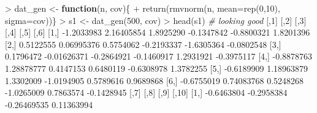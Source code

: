 \documentclass[
]{article}
\newenvironment{Shaded}{\begin{snugshade}}{\end{snugshade}}
\newcommand{\AttributeTok}[1]{\textcolor[rgb]{0.77,0.63,0.00}{#1}}
\newcommand{\CommentTok}[1]{\textcolor[rgb]{0.56,0.35,0.01}{\textit{#1}}}
\newcommand{\ControlFlowTok}[1]{\textcolor[rgb]{0.13,0.29,0.53}{\textbf{#1}}}
\newcommand{\DecValTok}[1]{\textcolor[rgb]{0.00,0.00,0.81}{#1}}
\newcommand{\FloatTok}[1]{\textcolor[rgb]{0.00,0.00,0.81}{#1}}
\newcommand{\FunctionTok}[1]{\textcolor[rgb]{0.00,0.00,0.00}{#1}}
\newcommand{\NormalTok}[1]{#1}
\newcommand{\OtherTok}[1]{\textcolor[rgb]{0.56,0.35,0.01}{#1}}
\newcommand{\SpecialCharTok}[1]{\textcolor[rgb]{0.00,0.00,0.00}{#1}}
\begin{document}
\begin{Shaded}
\begin{Highlighting}[]
\SpecialCharTok{\textgreater{}}\NormalTok{ dat\_gen }\OtherTok{\textless{}{-}} \ControlFlowTok{function}\NormalTok{(n, cov)\{}
\SpecialCharTok{+}   \FunctionTok{return}\NormalTok{(}\FunctionTok{rmvnorm}\NormalTok{(n, }\AttributeTok{mean=}\FunctionTok{rep}\NormalTok{(}\DecValTok{0}\NormalTok{,}\DecValTok{10}\NormalTok{), }\AttributeTok{sigma=}\NormalTok{cov))\}}
\SpecialCharTok{\textgreater{}}\NormalTok{ s1 }\OtherTok{\textless{}{-}} \FunctionTok{dat\_gen}\NormalTok{(}\DecValTok{500}\NormalTok{, cov)}
\SpecialCharTok{\textgreater{}} \FunctionTok{head}\NormalTok{(s1) }\CommentTok{\# looking good}
\NormalTok{           [,}\DecValTok{1}\NormalTok{]        [,}\DecValTok{2}\NormalTok{]       [,}\DecValTok{3}\NormalTok{]       [,}\DecValTok{4}\NormalTok{]       [,}\DecValTok{5}\NormalTok{]       [,}\DecValTok{6}\NormalTok{]}
\NormalTok{[}\DecValTok{1}\NormalTok{,] }\SpecialCharTok{{-}}\FloatTok{1.2033983}  \FloatTok{2.16405854}  \FloatTok{1.8925290} \SpecialCharTok{{-}}\FloatTok{0.1347842} \SpecialCharTok{{-}}\FloatTok{0.8800321}  \FloatTok{1.8201396}
\NormalTok{[}\DecValTok{2}\NormalTok{,]  }\FloatTok{0.5122555}  \FloatTok{0.06995376}  \FloatTok{0.5754062} \SpecialCharTok{{-}}\FloatTok{0.2193337} \SpecialCharTok{{-}}\FloatTok{1.6305364} \SpecialCharTok{{-}}\FloatTok{0.0802548}
\NormalTok{[}\DecValTok{3}\NormalTok{,]  }\FloatTok{0.1796472} \SpecialCharTok{{-}}\FloatTok{0.01626371} \SpecialCharTok{{-}}\FloatTok{0.2864921} \SpecialCharTok{{-}}\FloatTok{0.1460917}  \FloatTok{1.2931921} \SpecialCharTok{{-}}\FloatTok{0.3975117}
\NormalTok{[}\DecValTok{4}\NormalTok{,] }\SpecialCharTok{{-}}\FloatTok{0.8878763}  \FloatTok{1.28878777}  \FloatTok{0.4147153}  \FloatTok{0.6480119} \SpecialCharTok{{-}}\FloatTok{0.6308978}  \FloatTok{1.3782255}
\NormalTok{[}\DecValTok{5}\NormalTok{,] }\SpecialCharTok{{-}}\FloatTok{0.6189909}  \FloatTok{1.18963879}  \FloatTok{1.3302009} \SpecialCharTok{{-}}\FloatTok{1.0194905}  \FloatTok{0.5789616}  \FloatTok{0.9689868}
\NormalTok{[}\DecValTok{6}\NormalTok{,] }\SpecialCharTok{{-}}\FloatTok{0.6755019}  \FloatTok{0.74083768}  \FloatTok{0.5248268} \SpecialCharTok{{-}}\FloatTok{1.0265009}  \FloatTok{0.7863574} \SpecialCharTok{{-}}\FloatTok{0.1428945}
\NormalTok{           [,}\DecValTok{7}\NormalTok{]       [,}\DecValTok{8}\NormalTok{]        [,}\DecValTok{9}\NormalTok{]       [,}\DecValTok{10}\NormalTok{]}
\NormalTok{[}\DecValTok{1}\NormalTok{,] }\SpecialCharTok{{-}}\FloatTok{0.6463804} \SpecialCharTok{{-}}\FloatTok{0.2958384} \SpecialCharTok{{-}}\FloatTok{0.26469535}  \FloatTok{0.11363994}

\end{Highlighting}
\end{Shaded}
\end{document}
